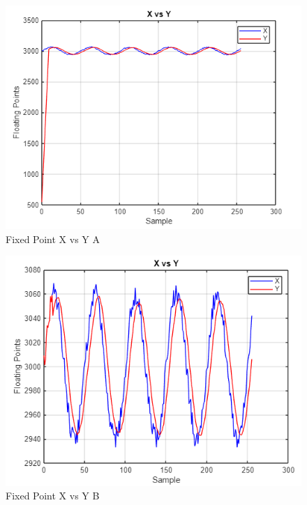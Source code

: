 \documentclass[journal]{IEEEtran}
\begin{document}
\begin{figure}[H]
    \centering
    \includegraphics[width=\linewidth]{3.1.png}
    \caption{Fixed Point X vs Y A}
    \label{fig:part3A}
\end{figure}

\begin{figure}[H]
    \centering
    \includegraphics[width=\linewidth]{3.2.png}
    \caption{Fixed Point X vs Y B}
    \label{fig:part3B}
\end{figure}
\end{document}
